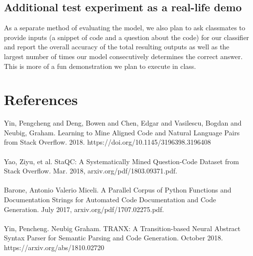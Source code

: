 \documentclass[11pt,a4paper]{article}
\begin{document}
\subsection{Additional test experiment as a real-life demo}
As a separate method of evaluating the model, we also plan to ask classmates to provide inputs (a snippet of code and a question about the code) for our classifier and report the overall accuracy of the total resulting outputs as well as the largest number of times our model consecutively determines the correct answer. This is more of a fun demonstration we plan to execute in class.


\section{References}
Yin, Pengcheng and Deng, Bowen and Chen, Edgar and Vasilescu, Bogdan and Neubig, Graham. Learning to Mine Aligned Code and Natural Language Pairs from Stack Overflow. 2018. https://doi.org/10.1145/3196398.3196408 \\ \\
Yao, Ziyu, et al. StaQC: A Systematically Mined Question-Code Dataset from Stack Overflow. Mar. 2018, arxiv.org/pdf/1803.09371.pdf. \\ \\
Barone, Antonio  Valerio Miceli. A Parallel Corpus of Python Functions and Documentation Strings for Automated Code Documentation and Code Generation. July 2017, arxiv.org/pdf/1707.02275.pdf. \\ \\
Yin, Pencheng. Neubig Graham. TRANX: A Transition-based Neural Abstract Syntax Parser for Semantic Parsing and Code Generation. October 2018. https://arxiv.org/abs/1810.02720 \\ \\
\end{document}
